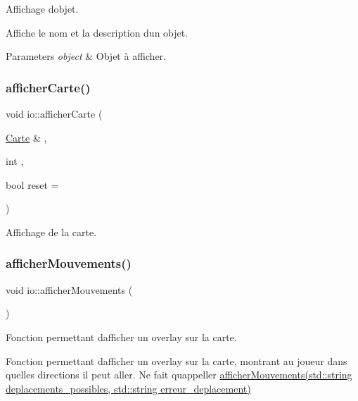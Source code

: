 Affichage d\textquotesingle{}objet. 

Affiche le nom et la description d\textquotesingle{}un objet.


\begin{DoxyParams}{Parameters}
{\em object} & Objet à afficher. \\
\hline
\end{DoxyParams}
\mbox{\label{namespaceio_ad1c0f5f45e4ec19ee5dbc108314eacbc}} 
\subsubsection{\texorpdfstring{afficher\+Carte()}{afficherCarte()}}
{\footnotesize\ttfamily void io\+::afficher\+Carte (\begin{DoxyParamCaption}\item[{\hyperlink{class_carte}{Carte} \&}]{,  }\item[{int}]{,  }\item[{bool}]{reset = {} }\end{DoxyParamCaption})}



Affichage de la carte. 

\mbox{\label{namespaceio_ac60b7c3503eb53e69a2adc86368ab633}} 
\subsubsection{\texorpdfstring{afficher\+Mouvements()}{afficherMouvements()}\hspace{0.1cm}{\footnotesize\ttfamily [1/4]}}
{\footnotesize\ttfamily void io\+::afficher\+Mouvements (\begin{DoxyParamCaption}{ }\end{DoxyParamCaption})}



Fonction permettant d\textquotesingle{}afficher un overlay sur la carte. 

Fonction permettant d\textquotesingle{}afficher un overlay sur la carte, montrant au joueur dans quelles directions il peut aller. Ne fait qu\textquotesingle{}appeller \hyperlink{namespaceio_ac0728fb89b032a7b33641e0d2c34cc28}{afficher\+Mouvements(std\+::string deplacements\+\_\+possibles, std\+::string erreur\+\_\+deplacement)}

